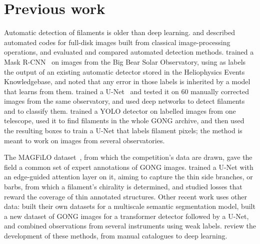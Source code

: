 \section{Previous work}\label{sec:intro-previous}
Automatic detection of filaments is older than deep learning. \citet{bernasconi2005} and
\citet{qu2005} described automated codes for full-disk \Ha{} images built from classical
image-processing operations, and \citet{schuh2014} evaluated and compared automated detection
methods. \citet{ahmadzadeh2019} trained a Mask R-CNN~\citep{maskrcnn} on images from the Big Bear
Solar Observatory, using as labels the output of an existing automatic detector stored in the
Heliophysics Events Knowledgebase, and noted that any error in those labels is inherited by a
model that learns from them. \citet{zhu2019} trained a U-Net~\citep{unet} and tested it on 60 manually
corrected images from the same observatory, and \citet{guo2022} used deep networks
to detect filaments and to classify them. \citet{diercke2024} trained a YOLO detector on labelled
images from one telescope, used it to find filaments in the whole GONG archive, and then used the
resulting boxes to train a U-Net that labels filament pixels; the method is meant to work on
images from several observatories.

The MAGFiLO dataset~\citep{magfilo}, from which the competition's data are drawn, gave the field a
common set of expert annotations of GONG images. \citet{edgeattnet} trained a U-Net with an
edge-guided attention layer on it, aiming to capture the thin side branches, or barbs, from which
a filament's chirality is determined, and \citet{hao2026sabr} studied losses that reward the
coverage of thin annotated structures. Other recent work uses other data: \citet{hu2026morden}
built their own datasets for a multiscale semantic segmentation model, \citet{reche2026} built a
new dataset of GONG images for a transformer detector followed by a U-Net, and
\citet{srivastava2026} combined observations from several instruments using weak labels.
\citet{hu2026review} review the development of these methods, from manual catalogues to deep
learning.


